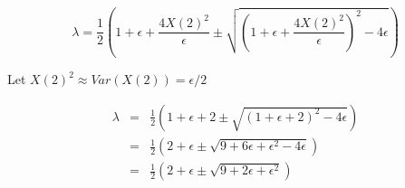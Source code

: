 \documentclass[12pt]{article}
\begin{document}
\begin{equation}
\lambda = \frac{1}{2} \left( 1 + \epsilon + \frac{4 X(2)^2}{\epsilon}  \pm \sqrt{\left( 1 + \epsilon + \frac{4 X(2)^2}{\epsilon} \right)^2 - 4 \epsilon}\right)
\end{equation}

Let $X(2)^2 \approx Var(X(2)) = \epsilon/2$

\begin{eqnarray}
\lambda &=& 
\frac{1}{2} \left( 1 + \epsilon + 2  \pm \sqrt{\left( 1 + \epsilon + 2 \right)^2 - 4 \epsilon}\right) \\
&=& \frac{1}{2} \left( 2 + \epsilon \pm \sqrt{ 9 + 6 \epsilon + \epsilon^2 - 4 \epsilon}\right) \\
&=& \frac{1}{2} \left( 2 + \epsilon \pm \sqrt{ 9 + 2 \epsilon + \epsilon^2}\right)
\end{eqnarray}
\end{document}
